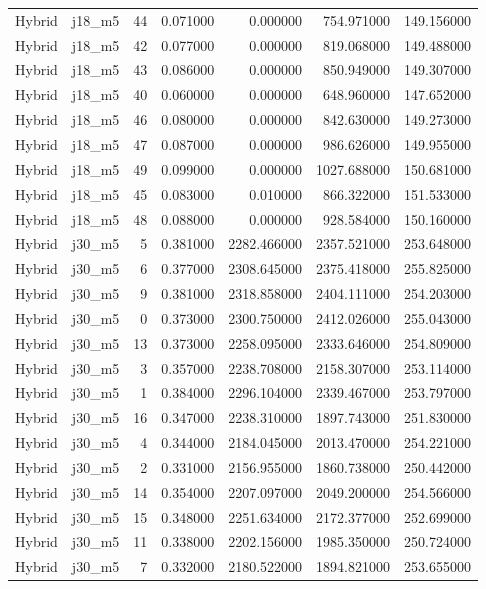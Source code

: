 \begin{tabular}{llrrrrr}
Hybrid & j18_m5 & 44 & 0.071000 & 0.000000 & 754.971000 & 149.156000 \\
Hybrid & j18_m5 & 42 & 0.077000 & 0.000000 & 819.068000 & 149.488000 \\
Hybrid & j18_m5 & 43 & 0.086000 & 0.000000 & 850.949000 & 149.307000 \\
Hybrid & j18_m5 & 40 & 0.060000 & 0.000000 & 648.960000 & 147.652000 \\
Hybrid & j18_m5 & 46 & 0.080000 & 0.000000 & 842.630000 & 149.273000 \\
Hybrid & j18_m5 & 47 & 0.087000 & 0.000000 & 986.626000 & 149.955000 \\
Hybrid & j18_m5 & 49 & 0.099000 & 0.000000 & 1027.688000 & 150.681000 \\
Hybrid & j18_m5 & 45 & 0.083000 & 0.010000 & 866.322000 & 151.533000 \\
Hybrid & j18_m5 & 48 & 0.088000 & 0.000000 & 928.584000 & 150.160000 \\
Hybrid & j30_m5 & 5 & 0.381000 & 2282.466000 & 2357.521000 & 253.648000 \\
Hybrid & j30_m5 & 6 & 0.377000 & 2308.645000 & 2375.418000 & 255.825000 \\
Hybrid & j30_m5 & 9 & 0.381000 & 2318.858000 & 2404.111000 & 254.203000 \\
Hybrid & j30_m5 & 0 & 0.373000 & 2300.750000 & 2412.026000 & 255.043000 \\
Hybrid & j30_m5 & 13 & 0.373000 & 2258.095000 & 2333.646000 & 254.809000 \\
Hybrid & j30_m5 & 3 & 0.357000 & 2238.708000 & 2158.307000 & 253.114000 \\
Hybrid & j30_m5 & 1 & 0.384000 & 2296.104000 & 2339.467000 & 253.797000 \\
Hybrid & j30_m5 & 16 & 0.347000 & 2238.310000 & 1897.743000 & 251.830000 \\
Hybrid & j30_m5 & 4 & 0.344000 & 2184.045000 & 2013.470000 & 254.221000 \\
Hybrid & j30_m5 & 2 & 0.331000 & 2156.955000 & 1860.738000 & 250.442000 \\
Hybrid & j30_m5 & 14 & 0.354000 & 2207.097000 & 2049.200000 & 254.566000 \\
Hybrid & j30_m5 & 15 & 0.348000 & 2251.634000 & 2172.377000 & 252.699000 \\
Hybrid & j30_m5 & 11 & 0.338000 & 2202.156000 & 1985.350000 & 250.724000 \\
Hybrid & j30_m5 & 7 & 0.332000 & 2180.522000 & 1894.821000 & 253.655000 \\

\end{tabular}
